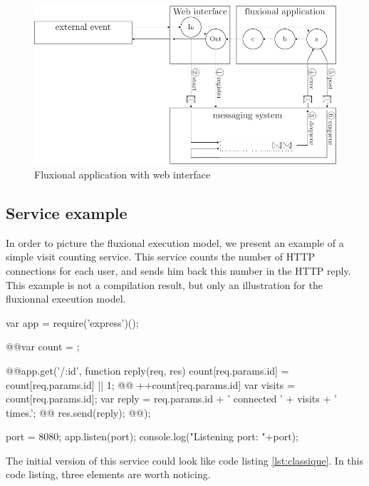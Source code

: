 \begin{figure}[h!]
	\includegraphics[width=\linewidth]{ressources/schema-web.pdf}
	\caption{Fluxional application with web interface}
	\label{fig:schemaweb}
\end{figure}


\subsection{Service example}

In order to picture the fluxional execution model, we present an example of a simple visit counting service.
This service counts the number of HTTP connections for each user, and sends him back this number in the HTTP reply.
This example is not a compilation result, but only an illustration for the fluxionnal execution model.

\begin{code}[js, caption={Original code of a simple service example},label={lst:classique}]
var app = require('express')();

@\label{lst:classique_count}@var count = {};

@\label{lst:classique_get}\label{lst:classique_replyb}@app.get('/:id', function reply(req, res){
  count[req.params.id] = count[req.params.id]  || 1; @\label{lst:classique_dynres}@
  ++count[req.params.id] 
  var visits = count[req.params.id];
  var reply = req.params.id + ' connected ' + visits + ' times.';
@\label{lst:classique_send}@  res.send(reply);
@\label{lst:classique_replye}@});

port = 8080;
app.listen(port);
console.log("Listening port: "+port);
\end{code}

The initial version of this service could look like code listing \ref{lst:classique}.
In this code listing, three elements are worth noticing.

